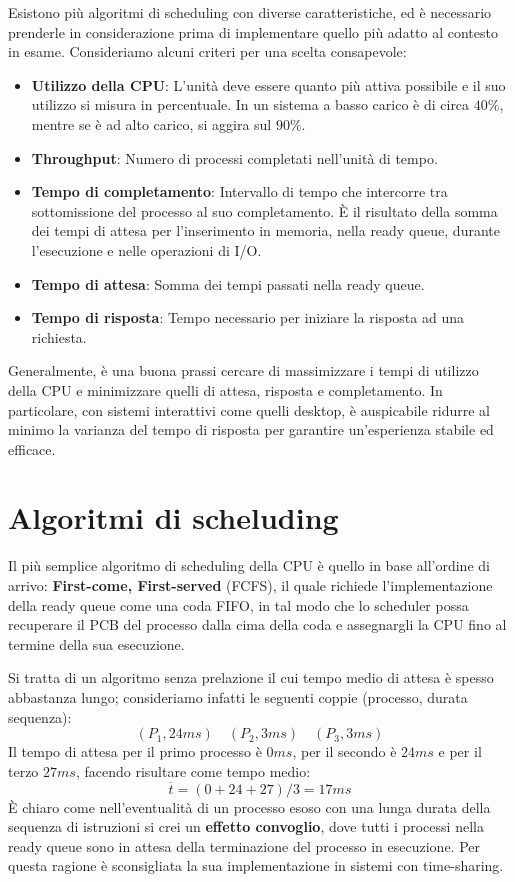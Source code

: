 \noindent Esistono più algoritmi di scheduling con diverse caratteristiche, ed è necessario prenderle in considerazione prima di implementare quello più
adatto al contesto in esame. Consideriamo alcuni criteri per una scelta consapevole: \begin{itemize}
    \item \textbf{Utilizzo della CPU}: L'unità deve essere quanto più attiva possibile e il suo utilizzo si misura in percentuale. In un sistema a basso
    carico è di circa $40\%$, mentre se è ad alto carico, si aggira sul $90\%$.
    \item \textbf{Throughput}: Numero di processi completati nell'unità di tempo.
    \item \textbf{Tempo di completamento}: Intervallo di tempo che intercorre tra sottomissione del processo al suo completamento. È il risultato della
    somma dei tempi di attesa per l'inserimento in memoria, nella ready queue, durante l'esecuzione e nelle operazioni di I/O.
    \item \textbf{Tempo di attesa}: Somma dei tempi passati nella ready queue.
    \item \textbf{Tempo di risposta}: Tempo necessario per iniziare la risposta ad una richiesta.
\end{itemize}
\noindent Generalmente, è una buona prassi cercare di massimizzare i tempi di utilizzo della CPU e minimizzare quelli di attesa, risposta e
completamento. In particolare, con sistemi interattivi come quelli desktop, è auspicabile ridurre al minimo la varianza del tempo di risposta per
garantire un'esperienza stabile ed efficace.

%

\section{Algoritmi di scheluding}
Il più semplice algoritmo di scheduling della CPU è quello in base all'ordine di arrivo: \textbf{First-come, First-served} (FCFS), il quale richiede
l'implementazione della ready queue come una coda FIFO, in tal modo che lo scheduler possa recuperare il PCB del processo dalla cima della coda e
assegnargli la CPU fino al termine della sua esecuzione.\par
Si tratta di un algoritmo senza prelazione il cui tempo medio di attesa è spesso abbastanza lungo; consideriamo infatti le seguenti coppie (processo,
durata sequenza): \[
    (P_1, 24ms)\quad (P_2, 3ms)\quad (P_3, 3ms)
\]
\noindent Il tempo di attesa per il primo processo è $0ms$, per il secondo è $24ms$ e per il terzo $27ms$, facendo risultare come tempo medio: \[
    \overline{t} = (0+24+27)/3 = 17ms
\]
\noindent È chiaro come nell'eventualità di un processo esoso con una lunga durata della sequenza di istruzioni si crei un \textbf{effetto convoglio},
dove tutti i processi nella ready queue sono in attesa della terminazione del processo in esecuzione. Per questa ragione è sconsigliata la sua
implementazione in sistemi con time-sharing.

